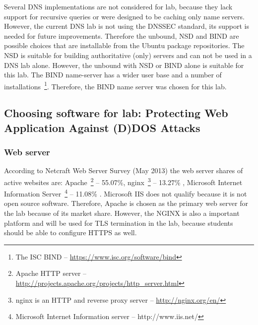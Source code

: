 Several \gls{DNS} implementations are not considered for lab, because they lack support for recursive queries or  were designed to be caching only name servers. However, the current \gls{DNS} lab is not using the \gls{DNSSEC} standard, its support is needed for future improvements. Therefore the unbound, NSD and \gls{BIND} are possible choices that are installable from the Ubuntu package repositories. The NSD is suitable for building authoritative (only) servers and can not be used in a \gls{DNS} lab alone.
However, the unbound with NSD or \gls{BIND} alone is suitable for this lab. The \gls{BIND} name-server has a wider user base and a number of installations~\footnote{The \gls{ISC} \gls{BIND} -- \url{https://www.isc.org/software/bind}}. Therefore, the \gls{BIND} name server was chosen for this lab.


\subsection{Choosing software for lab: Protecting Web Application Against (D)DOS Attacks}

\subsubsection{Web server}
According to Netcraft Web Server Survey (May 2013) the web server shares of active websites are: Apache~\footnote{Apache \gls{HTTP} server -- \url{http://projects.apache.org/projects/http_server.html}} -- 55.07\%,  nginx~\footnote{nginx is an HTTP and reverse proxy server -- \url{http://nginx.org/en/}} -- 13.27\%	, Microsoft Internet Information Server~\footnote{Microsoft Internet Information server -- http://www.iis.net/} -- 11.08\% \citep{website:netcraft_web}. Microsoft IIS does not qualify because it is not open source software.  Therefore, Apache is chosen as the primary web server for the lab because of its market share. However, the NGINX is also a important platform and will be used for \gls{TLS} termination in the lab, because students should be able to configure \gls{HTTPS} as well.


